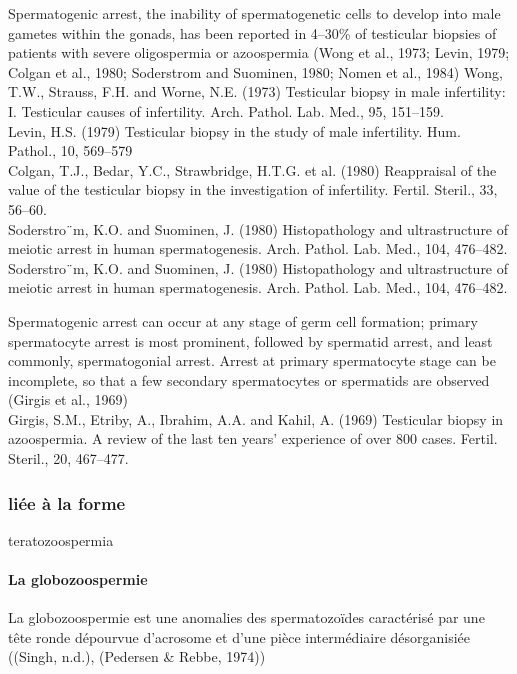 \documentclass[12pt,twoside]{reedthesis}
\theoremstyle{definition}
\theoremstyle{definition}
\theoremstyle{remark}
\begin{document}
  Spermatogenic arrest, the inability of spermatogenetic cells to develop
  into male gametes within the gonads, has been reported in 4--30\% of
  testicular biopsies of patients with severe oligospermia or azoospermia
  (Wong et al., 1973; Levin, 1979; Colgan et al., 1980; Soderstrom and
  Suominen, 1980; Nomen et al., 1984) Wong, T.W., Strauss, F.H. and Worne,
  N.E. (1973) Testicular biopsy in male infertility: I. Testicular causes
  of infertility. Arch. Pathol. Lab. Med., 95, 151--159.\\
  Levin, H.S. (1979) Testicular biopsy in the study of male infertility.
  Hum. Pathol., 10, 569--579\\
  Colgan, T.J., Bedar, Y.C., Strawbridge, H.T.G. et al. (1980) Reappraisal
  of the value of the testicular biopsy in the investigation of
  infertility. Fertil. Steril., 33, 56--60.\\
  Soderstro¨m, K.O. and Suominen, J. (1980) Histopathology and
  ultrastructure of meiotic arrest in human spermatogenesis. Arch. Pathol.
  Lab. Med., 104, 476--482.\\
  Soderstro¨m, K.O. and Suominen, J. (1980) Histopathology and
  ultrastructure of meiotic arrest in human spermatogenesis. Arch. Pathol.
  Lab. Med., 104, 476--482.
  
  Spermatogenic arrest can occur at any stage of germ cell formation;
  primary spermatocyte arrest is most prominent, followed by spermatid
  arrest, and least commonly, spermatogonial arrest. Arrest at primary
  spermatocyte stage can be incomplete, so that a few secondary
  spermatocytes or spermatids are observed (Girgis et al., 1969)\\
  Girgis, S.M., Etriby, A., Ibrahim, A.A. and Kahil, A. (1969) Testicular
  biopsy in azoospermia. A review of the last ten years' experience of
  over 800 cases. Fertil. Steril., 20, 467--477.
  
  \subsubsection{liée à la forme}\label{liee-a-la-forme}
  
  teratozoospermia
  
  \paragraph{La globozoospermie}\label{la-globozoospermie}
  
  La globozoospermie est une anomalies des spermatozoïdes caractérisé par
  une tête ronde dépourvue d'acrosome et d'une pièce intermédiaire
  désorganisiée ((Singh, n.d.), (Pedersen \& Rebbe, 1974))
  
\end{document}
